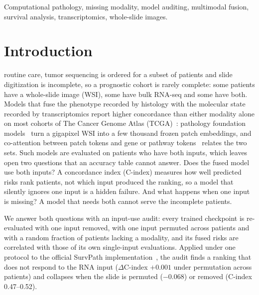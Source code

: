 \documentclass[journal]{IEEEtran}
\newcommand{\cindex}{C-index}
\begin{document}
\begin{IEEEkeywords}
Computational pathology, missing modality, model auditing, multimodal fusion, survival analysis, transcriptomics, whole-slide images.
\end{IEEEkeywords}

\section{Introduction}
\label{sec:intro}

 routine care, tumor sequencing is ordered for a subset of patients and slide digitization is incomplete, so a prognostic cohort is rarely complete: some patients have a whole-slide image (WSI), some have bulk RNA-seq and some have both. Models that fuse the phenotype recorded by histology with the molecular state recorded by transcriptomics report higher concordance than either modality alone on most cohorts of The Cancer Genome Atlas (TCGA)~\cite{chen2022pancancer,jaume2024survpath,song2024mmp}: pathology foundation models~\cite{chen2024uni,xu2024gigapath,vorontsov2024virchow} turn a gigapixel WSI into a few thousand frozen patch embeddings, and co-attention between patch tokens and gene or pathway tokens~\cite{chen2021mcat,jaume2024survpath} relates the two sets. Such models are evaluated on patients who have both inputs, which leaves open two questions that an accuracy table cannot answer. Does the fused model use both inputs? A concordance index (\cindex{}) measures how well predicted risks rank patients, not which input produced the ranking, so a model that silently ignores one input is a hidden failure. And what happens when one input is missing? A model that needs both cannot serve the incomplete patients.

We answer both questions with an input-use audit: every trained checkpoint is re-evaluated with one input removed, with one input permuted across patients and with a random fraction of patients lacking a modality, and its fused risks are correlated with those of its own single-input evaluations. Applied under one protocol to the official SurvPath implementation~\cite{jaume2024survpath}, the audit finds a ranking that does not respond to the RNA input ($\Delta$\cindex{} $+0.001$ under permutation across patients) and collapses when the slide is permuted ($-0.068$) or removed (\cindex{} 0.47--0.52).
\end{document}

